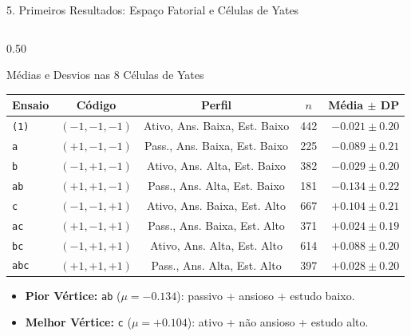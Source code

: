 \documentclass[aspectratio=169, 10pt]{beamer}
\begin{document}
\begin{frame}{5. Primeiros Resultados: Espaço Fatorial e Células de Yates}
\begin{columns}[c]
        \begin{column}{0.50\textwidth}
            \begin{block}{Médias e Desvios nas 8 Células de Yates}
                \centering \scriptsize
                \begin{tabular}{lcccr}
                    \toprule
                    \textbf{Ensaio} & \textbf{Código} & \textbf{Perfil} & $n$ & \textbf{Média $\pm$ DP} \\
                    \midrule
                    \texttt{(1)} & $(-1,-1,-1)$ & Ativo, Ans. Baixa, Est. Baixo & 442 & $-0.021 \pm 0.20$ \\
                    \texttt{a}   & $(+1,-1,-1)$ & Pass., Ans. Baixa, Est. Baixo & 225 & $-0.089 \pm 0.21$ \\
                    \texttt{b}   & $(-1,+1,-1)$ & Ativo, Ans. Alta, Est. Baixo  & 382 & $-0.029 \pm 0.20$ \\
                    \texttt{ab}  & $(+1,+1,-1)$ & Pass., Ans. Alta, Est. Baixo  & 181 & $\mathbf{-0.134} \pm 0.22$ \\
                    \texttt{c}   & $(-1,-1,+1)$ & Ativo, Ans. Baixa, Est. Alto  & 667 & $\mathbf{+0.104} \pm 0.21$ \\
                    \texttt{ac}  & $(+1,-1,+1)$ & Pass., Ans. Baixa, Est. Alto  & 371 & $+0.024 \pm 0.19$ \\
                    \texttt{bc}  & $(-1,+1,+1)$ & Ativo, Ans. Alta, Est. Alto   & 614 & $+0.088 \pm 0.20$ \\
                    \texttt{abc} & $(+1,+1,+1)$ & Pass., Ans. Alta, Est. Alto   & 397 & $+0.028 \pm 0.20$ \\
                    \bottomrule
                \end{tabular}
            \end{block}
            \vspace{-2pt}
            \begin{itemize}\scriptsize
                \item \textbf{Pior Vértice:} \texttt{ab} ($\mu = -0.134$): passivo + ansioso + estudo baixo.
                \item \textbf{Melhor Vértice:} \texttt{c} ($\mu = +0.104$): ativo + não ansioso + estudo alto.
            \end{itemize}
        \end{column}
    \end{columns}
\end{frame}
\end{document}
